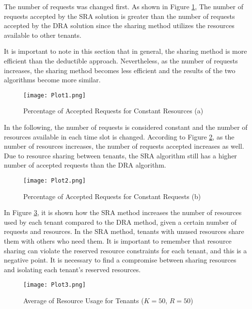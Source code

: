 \documentclass[conference]{IEEEtran}
\begin{document}
The number of requests was changed first. As shown in Figure \ref{fig1}, The number of requests accepted by the SRA solution is greater than the number of requests accepted by the DRA solution since the sharing method utilizes the resources available to other tenants. 

It is important to note in this section that in general, the sharing method is more efficient than the deductible approach. Nevertheless, as the number of requests increases, the sharing method becomes less efficient and the results of the two algorithms become more similar.

\begin{figure}[htbp]
\centerline{\texttt{[image: Plot1.png]}}
\vspace*{-9mm}\hspace*{0mm}\caption{Percentage of Accepted Requests for Constant Resources (a)}
\label{fig1}
\end{figure}

In the following, the number of requests is considered constant and the number of resources available in each time slot is changed. According to Figure \ref{fig2}, as the number of resources increases, the number of requests accepted increases as well. Due to resource sharing between tenants, the SRA algorithm still has a higher number of accepted requests than the DRA algorithm.

\begin{figure}[htbp]
\centerline{\texttt{[image: Plot2.png]}}
\vspace*{-9mm}\hspace*{0mm}\caption{Percentage of Accepted Requests for Constant Requests (b)}
\label{fig2}
\end{figure}

In Figure \ref{fig3}, it is shown how the SRA method increases the number of resources used by each tenant compared to the DRA method, given a certain number of requests and resources. In the SRA method, tenants with unused resources share them with others who need them. It is important to remember that resource sharing can violate the reserved resource constraints for each tenant, and this is a negative point. It is necessary to find a compromise between sharing resources and isolating each tenant's reserved resources.

\begin{figure}[htbp]
\centerline{\texttt{[image: Plot3.png]}}
\vspace*{-4mm}\hspace*{0mm}\caption{Average of Resource Usage for Tenants ($K=50$, $R=50$)}
\label{fig3}
\end{figure}
\end{document}
